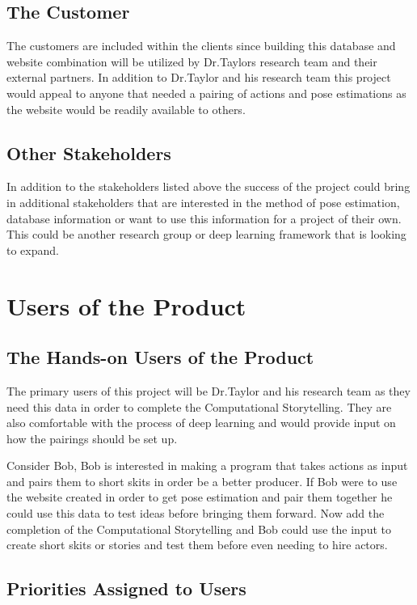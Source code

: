 \documentclass{scrreprt}
\begin{document}
\subsection{The Customer}

The customers are included within the clients since building this database and
website combination will be utilized by Dr.Taylors research team and their
external partners. In addition to Dr.Taylor and his research team this project
would appeal to anyone that needed a pairing of actions and pose estimations as
the website would be readily available to others.

\subsection{Other Stakeholders}

In addition to the stakeholders listed above the success of the project could
bring in additional stakeholders that are interested in the method of pose
estimation, database information or want to use this information for a project
of their own. This could be another research group or deep learning framework
that is looking to expand.

\section{Users of the Product}

\subsection{The Hands-on Users of the Product}

The primary users of this project will be Dr.Taylor and his research team as
they need this data in order to complete the Computational Storytelling. They
are also comfortable with the process of deep learning and would provide input
on how the pairings should be set up.

Consider Bob, Bob is interested in making a program that takes actions as input
and pairs them to short skits in order be a better producer. If Bob were to use
the website created in order to get pose estimation and pair them together he
could use this data to test ideas before bringing them forward. Now add the
completion of the Computational Storytelling and Bob could use the input to
create short skits or stories and test them before even needing to hire actors.

\subsection{Priorities Assigned to Users}
\end{document}
